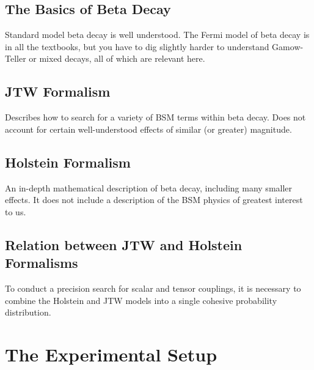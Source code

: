 \section{The Basics of Beta Decay}
	Standard model beta decay is well understood.  The Fermi model of beta decay is in all the textbooks, but you have to dig slightly harder to understand Gamow-Teller or mixed decays, all of which are relevant here.
	
\section{JTW Formalism}	
	Describes how to search for a variety of BSM terms within beta decay.  Does not account for certain well-understood effects of similar (or greater) magnitude.
	
\section{Holstein Formalism}
	An in-depth mathematical description of beta decay, including many smaller effects.  It does not include a description of the BSM physics of greatest interest to us.   
	
\section{Relation between JTW and Holstein Formalisms}
	To conduct a precision search for scalar and tensor couplings, it is necessary to combine the Holstein and JTW models into a single cohesive probability distribution.  


\clearpage
\chapter{The Experimental Setup}
\label{setup_chapter}


